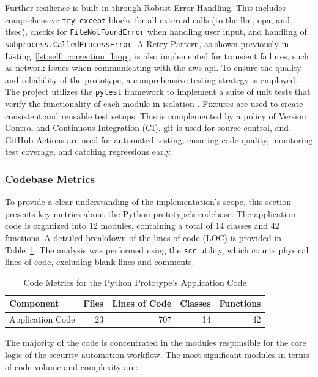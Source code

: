 Further resilience is built-in through Robust Error Handling. This includes comprehensive \texttt{try-except} blocks for all external calls (to the \gls{llm}, \gls{opa}, and tfsec), checks for \texttt{FileNotFoundError} when handling user input, and handling of \texttt{subprocess.CalledProcessError}. A Retry Pattern, as shown previously in Listing~\ref{lst:self_correction_loop}, is also implemented for transient failures, such as network issues when communicating with the \gls{aws} \gls{api}.
To ensure the quality and reliability of the prototype, a comprehensive testing strategy is employed. The project utilizes the \texttt{pytest} framework to implement a suite of unit tests that verify the functionality of each module in isolation \cite{noauthor_pytest_nodate}. Fixtures are used to create consistent and reusable test setups. This is complemented by a policy of Version Control and Continuous Integration (CI). \gls{git} is used for source control, and GitHub Actions are used for automated testing, ensuring code quality, monitoring test coverage, and catching regressions early.

\subsubsection{Codebase Metrics}

To provide a clear understanding of the implementation's scope, this section presents key metrics about the Python prototype's codebase. The application code is organized into 12 modules, containing a total of 14 classes and 42 functions. A detailed breakdown of the lines of code (LOC) is provided in Table~\ref{tab:code_metrics}. The analysis was performed using the \texttt{scc}\cite{boyter_scc_2024} utility, which counts physical lines of code, excluding blank lines and comments.
\begin{table}[htbp]
\centering
\caption{Code Metrics for the Python Prototype's Application Code}
\label{tab:code_metrics}
\begin{tabular}{lrrrr}
\toprule
\textbf{Component} & \textbf{Files} & \textbf{Lines of Code} & \textbf{Classes} & \textbf{Functions} \\
\midrule
Application Code & 23 & 707 & 14 & 42 \\
\bottomrule
\end{tabular}
\end{table}

The majority of the code is concentrated in the modules responsible for the core logic of the security automation workflow. The most significant modules in terms of code volume and complexity are:

